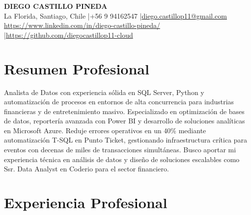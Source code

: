 \documentclass[11pt,letterpaper]{article}
\begin{document}
\begin{center}
{\fontsize{16}{19}\selectfont\textbf{\MakeUppercase{Diego Castillo Pineda}}}\\[4pt]
{\small La Florida, Santiago, Chile \quad|\quad +56 9 94162547 \quad|\quad \href{mailto:diego.castillop11@gmail.com}{diego.castillop11@gmail.com}\\
\href{https://https://www.linkedin.com/in/diego-castillo-pineda/}{https://www.linkedin.com/in/diego-castillo-pineda/} \quad|\quad \href{https://https://github.com/diegocastillop11-cloud}{https://github.com/diegocastillop11-cloud}}
\end{center}

\section{Resumen Profesional}
Analista de Datos con experiencia sólida en SQL Server, Python y automatización de procesos en entornos de alta concurrencia para industrias financieras y de entretenimiento masivo. Especializado en optimización de bases de datos, reportería avanzada con Power BI y desarrollo de soluciones analíticas en Microsoft Azure. Reduje errores operativos en un 40\% mediante automatización T-SQL en Punto Ticket, gestionando infraestructura crítica para eventos con decenas de miles de transacciones simultáneas. Busco aportar mi experiencia técnica en análisis de datos y diseño de soluciones escalables como Ssr. Data Analyst en Coderio para el sector financiero.

\section{Experiencia Profesional}
\end{document}
